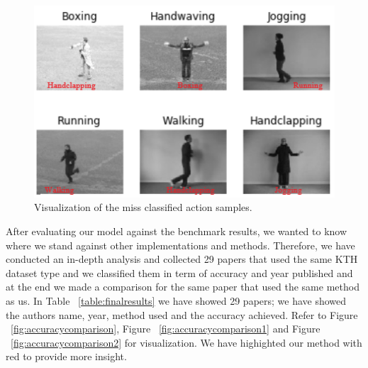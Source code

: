 \begin{figure}[ht]
\centering
\includegraphics[width=1.0\columnwidth]{Figures/missclassified.png}
\decoRule
\caption[Visualization of the miss classified action samples.]{Visualization of the miss classified action samples.}
\label{fig:missclassified1}
\end{figure}
After evaluating our model against the benchmark results, we wanted to know where we stand against other implementations and methods. Therefore, we have conducted an in-depth analysis and collected 29 papers that used the same KTH dataset type and we classified them in term of accuracy and year published and at the end we made a comparison for the same paper that used the same method as us. In Table ~\ref{table:finalresults} we have showed 29 papers; we have showed the authors name, year, method used and the accuracy achieved. Refer to Figure ~\ref{fig:accuracycomparison}, Figure ~\ref{fig:accuracycomparison1} and Figure ~\ref{fig:accuracycomparison2} for visualization. We have highighted our method with red to provide more insight.

